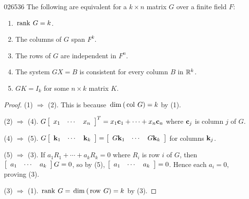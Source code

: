\begin{lemma}{}{026536}
The following are equivalent for a $k \times n$ matrix $G$ over a finite field $F$:

\begin{enumerate}
\item $\thinspace\operatorname{rank\medspace} G = k$.

\item The columns of $G$ span $F^{k}$.

\item The rows of $G$ are independent in $F^{n}$.

\item The system $GX = B$ is consistent for every column $B$ in $\mathbb{R}^k$.

\item $GK = I_{k}$ for some $n \times k$ matrix $K$.
\end{enumerate}
\end{lemma}

\begin{proof}
(1) $\Rightarrow$ (2). This is because $\thinspace\operatorname{dim\medspace}(\thinspace\operatorname{col\medspace} G) = k$ by (1).


\noindent (2) $\Rightarrow$ (4). $G
\left[ \begin{array}{ccc}
x_{1} & \cdots & x_{n}
\end{array} \right]^{T} = x_{1}\textbf{c}_{1} + \cdots + x_{n}\textbf{c}_{n}$ where $\textbf{c}_{j}$ is column $j$ of $G$.


\noindent (4) $\Rightarrow$ (5). $G
\left[ \begin{array}{ccc}
\textbf{k}_{1} & \cdots & \textbf{k}_{k}
\end{array} \right] = 
\left[ \begin{array}{ccc}
G\textbf{k}_{1} & \cdots & G\textbf{k}_{k}
\end{array} \right]$ for columns $\textbf{k}_{j}$.


\noindent (5) $\Rightarrow$ (3). If $a_{1}R_{1} + \cdots + a_{k}R_{k} = 0$ where $R_{i}$ is row $i$ of $G$, then $\left[ \begin{array}{ccc}
a_{1} & \cdots & a_{k}
\end{array} \right] G = 0$, so by (5),
$\left[ \begin{array}{ccc}
a_{1} & \cdots & a_{k}
\end{array} \right] = 0$. Hence each $a_{i} = 0$, proving (3).


\noindent (3) $\Rightarrow$ (1). $\thinspace\operatorname{rank\medspace} G = \thinspace\operatorname{dim\medspace}(\thinspace\operatorname{row\medspace} G) = k$ by (3).
\end{proof}

